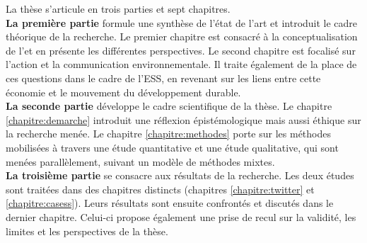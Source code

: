 La thèse s'articule en trois parties et sept chapitres.\\

\textbf{La première partie} formule une synthèse de l'état de l'art et introduit le cadre théorique de la recherche. Le premier chapitre est consacré à la conceptualisation de l'\ess et en présente les différentes perspectives. Le second chapitre est focalisé sur l'action et la communication environnementale. Il traite également de la place de ces questions dans le cadre de l'ESS, en revenant sur les liens entre cette économie et le mouvement du développement durable. \\

\textbf{La seconde partie } développe le cadre scientifique de la thèse. Le chapitre \ref{chapitre:demarche} introduit une réflexion épistémologique mais aussi éthique sur la recherche menée. Le chapitre \ref{chapitre:methodes} porte sur les méthodes mobilisées à travers une étude quantitative et une étude qualitative, qui sont menées parallèlement, suivant un modèle de méthodes mixtes. \\

\textbf{La troisième partie} se consacre aux résultats de la recherche. Les deux études sont traitées dans des chapitres distincts (chapitres \ref{chapitre:twitter} et \ref{chapitre:casess}). Leurs résultats sont ensuite confrontés et discutés dans le dernier chapitre. Celui-ci propose également une prise de recul sur la validité, les limites et les perspectives de la thèse.

